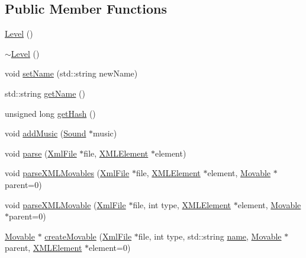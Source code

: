 \subsection*{Public Member Functions}
\begin{DoxyCompactItemize}
\item 
\hyperlink{class_rad_xml_1_1_level_a69811dcbea624bc8e72009bb991acb29}{Level} ()
\item 
\hyperlink{class_rad_xml_1_1_level_a097a8016559476a9a97f59ec036bfc67}{$\sim$\-Level} ()
\item 
void \hyperlink{class_rad_xml_1_1_level_ac7845bc40a2077c0c9da6b19ba5e82a5}{set\-Name} (std\-::string new\-Name)
\item 
std\-::string \hyperlink{class_rad_xml_1_1_level_a12a8c3a6a9ac38dc57cccb8f0273a542}{get\-Name} ()
\item 
unsigned long \hyperlink{class_rad_xml_1_1_level_a48ff3193aec92d0c7cad922d52a6e4e0}{get\-Hash} ()
\item 
void \hyperlink{class_rad_xml_1_1_level_ac88b66870ae181d24c52d5997f68a60e}{add\-Music} (\hyperlink{class_rad_xml_1_1_sound}{Sound} $\ast$music)
\item 
void \hyperlink{class_rad_xml_1_1_level_a64745c6a7e0753b15a67fd907ed0ba90}{parse} (\hyperlink{class_rad_xml_1_1_xml_file}{Xml\-File} $\ast$file, \hyperlink{class_x_m_l_element}{X\-M\-L\-Element} $\ast$element)
\item 
void \hyperlink{class_rad_xml_1_1_level_a0751475f90cd10f4e1b2e895678fa813}{parse\-X\-M\-L\-Movables} (\hyperlink{class_rad_xml_1_1_xml_file}{Xml\-File} $\ast$file, \hyperlink{class_x_m_l_element}{X\-M\-L\-Element} $\ast$element, \hyperlink{class_rad_xml_1_1_movable}{Movable} $\ast$parent=0)
\item 
void \hyperlink{class_rad_xml_1_1_level_a07dc3be61de67bb7b9ddcff7b149991b}{parse\-X\-M\-L\-Movable} (\hyperlink{class_rad_xml_1_1_xml_file}{Xml\-File} $\ast$file, int type, \hyperlink{class_x_m_l_element}{X\-M\-L\-Element} $\ast$element, \hyperlink{class_rad_xml_1_1_movable}{Movable} $\ast$parent=0)
\item 
\hyperlink{class_rad_xml_1_1_movable}{Movable} $\ast$ \hyperlink{class_rad_xml_1_1_level_af4906d9fd0b9d3b7bf1d8c9cb4da521d}{create\-Movable} (\hyperlink{class_rad_xml_1_1_xml_file}{Xml\-File} $\ast$file, int type, std\-::string \hyperlink{class_rad_xml_1_1_level_abc776669bbb0f37a6eed054b3708807b}{name}, \hyperlink{class_rad_xml_1_1_movable}{Movable} $\ast$parent, \hyperlink{class_x_m_l_element}{X\-M\-L\-Element} $\ast$element=0)
\item 

\end{DoxyCompactItemize}

